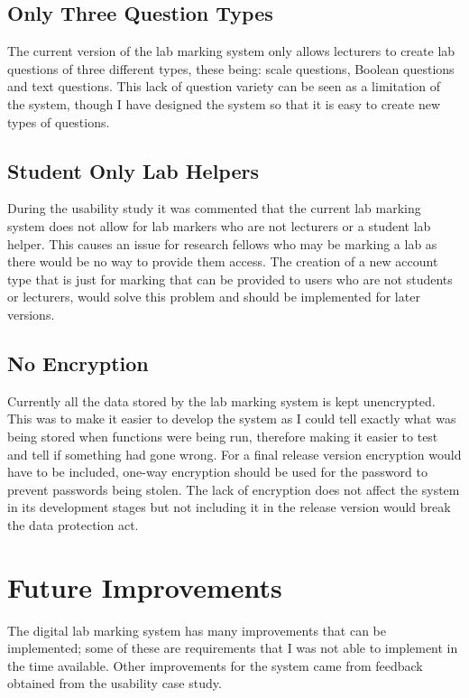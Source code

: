 \documentclass[11pt]{report}
\begin{document}
\subsection{Only Three Question Types}

The current version of the lab marking system only allows lecturers to create lab questions of three different types, these being: scale questions, Boolean questions and text questions. This lack of question variety can be seen as a limitation of the system, though I have designed the system so that it is easy to create new types of questions.

\subsection{Student Only Lab Helpers}

During the usability study it was commented that the current lab marking system does not allow for lab markers who are not lecturers or a student lab helper. This causes an issue for research fellows who may be marking a lab as there would be no way to provide them access. The creation of a new account type that is just for marking that can be provided to users who are not students or lecturers, would solve this problem and should be implemented for later versions.

\subsection{No Encryption}

Currently all the data stored by the lab marking system is kept unencrypted. This was to make it easier to develop the system as I could tell exactly what was being stored when functions were being run, therefore making it easier to test and tell if something had gone wrong. For a final release version encryption would have to be included, one-way encryption should be used for the password to prevent passwords being stolen. The lack of encryption does not affect the system in its development stages but not including it in the release version would break the data protection act. 



\section{Future Improvements}
The digital lab marking system has many improvements that can be implemented; some of these are requirements that I was not able to implement in the time available. Other improvements for the system came from feedback obtained from the usability case study. 
\end{document}
